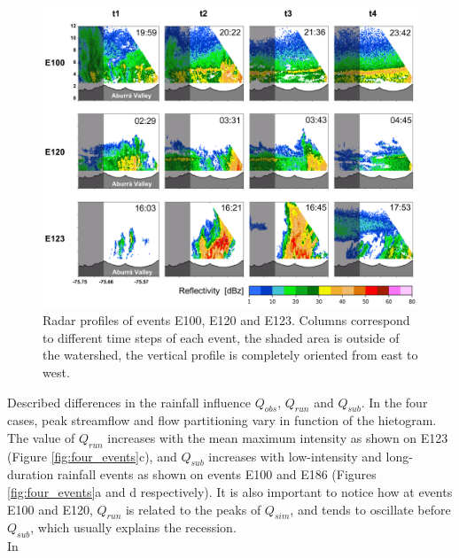 \documentclass[preprint,12pt]{elsarticle}
\begin{document}
\begin{figure}[!h]
    \centering
    \includegraphics[width=14cm]{Figuras/Perfiles_Radar.png}
    \caption{Radar profiles of events E100, E120 and E123. Columns correspond to 
    different time steps of each event, the shaded area is outside of the watershed, the vertical profile is completely oriented from east to west.}
    \label{fig:radar_profiles}
\end{figure}

Described differences in the rainfall influence $Q_{obs}$, $Q_{run}$ and $Q_{sub}$.  In the four cases, peak streamflow and flow partitioning vary in function of the hietogram.  The value of $Q_{run}$ increases with the mean maximum intensity as shown on E123 (Figure \ref{fig:four_events}c), and $Q_{sub}$ increases with low-intensity and long-duration rainfall events as shown on events E100 and E186 (Figures \ref{fig:four_events}a and d respectively).  It is also important to notice how at events E100 and E120, $Q_{run}$ is related to the peaks of $Q_{sim}$, and tends to oscillate before $Q_{sub}$, which usually explains the recession. \\

In
\end{document}

